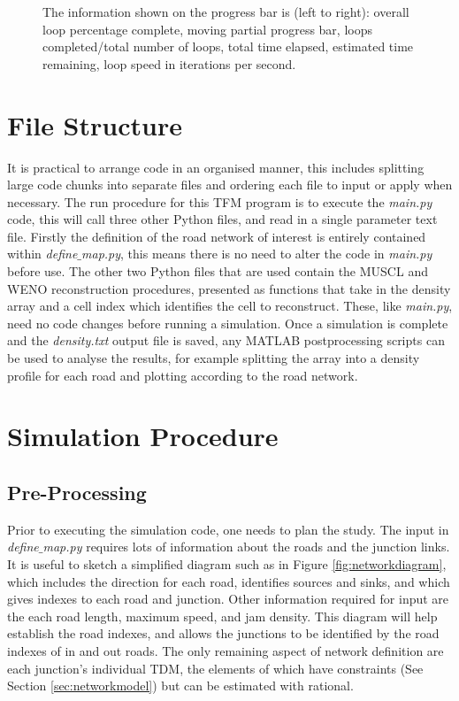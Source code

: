 	\begin{figure}
    		\centering
		\caption[Development : Simulation progress bar]{The information shown on the progress bar is (left to right): overall loop percentage complete, moving partial progress bar, loops completed/total number of loops, total time elapsed, estimated time remaining, loop speed in iterations per second.}
		\label{fig:dev:progressbar}
	\end{figure}
	
\section{File Structure}

	It is practical to arrange code in an organised manner, this includes splitting large code chunks into separate files and ordering each file to input or apply when necessary. The run procedure for this TFM program is to execute the \emph{main.py} code, this will call three other Python files, and read in a single parameter text file. Firstly the definition of the road network of interest is entirely contained within \emph{define$\_$map.py}, this means there is no need to alter the code in \emph{main.py} before use. The other two Python files that are used contain the MUSCL and WENO reconstruction procedures, presented as functions that take in the density array and a cell index which identifies the cell to reconstruct. These, like \emph{main.py}, need no code changes before running a simulation. Once a simulation is complete and the \emph{density.txt} output file is saved, any MATLAB postprocessing scripts can be used to analyse the results, for example splitting the array into a density profile for each road and plotting according to the road network. 
	
\section{Simulation Procedure}

\subsection{Pre-Processing}

	Prior to executing the simulation code, one needs to plan the study. The input in \emph{define$\_$map.py} requires lots of information about the roads and the junction links. It is useful to sketch a simplified diagram such as in Figure \ref{fig:networkdiagram}, which includes the direction for each road, identifies sources and sinks, and which gives indexes to each road and junction. Other information required for input are the each road length, maximum speed, and jam density. This diagram will help establish the road indexes, and allows the junctions to be identified by the road indexes of in and out roads. The only remaining aspect of network definition are each junction's individual TDM, the elements of which have constraints (See Section \ref{sec:networkmodel}) but can be estimated with rational.
	
